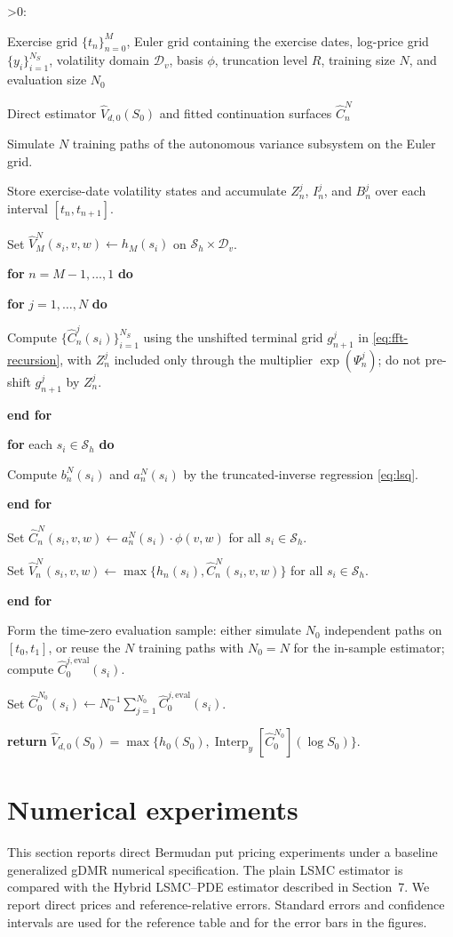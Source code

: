 \documentclass[pdflatex,sn-mathphys-num]{sn-jnl}
\makeatletter
\newcounter{ALG@line}
\newenvironment{algorithmic}[1][0]{%
  \setcounter{ALG@line}{0}%
  \def\ALG@freq{#1}%
  \begin{list}{\ifnum\ALG@freq>0\refstepcounter{ALG@line}\arabic{ALG@line}:\fi}{%
    \setlength{\leftmargin}{2.2em}%
    \setlength{\labelwidth}{1.8em}%
    \setlength{\labelsep}{0.4em}%
    \setlength{\itemsep}{2pt}%
    \setlength{\parsep}{0pt}%
    \setlength{\topsep}{3pt}%
  }%
}{\end{list}}
\newcommand{\Require}{\item[\textbf{Require:}]}
\newcommand{\Ensure}{\item[\textbf{Ensure:}]}
\newcommand{\State}{\item}
\newcommand{\For}[1]{\State \textbf{for} #1 \textbf{do}}
\newcommand{\EndFor}{\State \textbf{end for}}
\theoremstyle{thmstyleone}%
\theoremstyle{thmstylethree}%
\theoremstyle{thmstyletwo}%
\makeatother
\begin{document}
\begin{algorithm}[H]
\caption{Hybrid LSMC--PDE recursion}\label{alg:hybrid-lsmc-pde}
\begin{algorithmic}[1]
\Require Exercise grid $\{t_n\}_{n=0}^M$, Euler grid containing the exercise dates, log-price grid $\{y_i\}_{i=1}^{N_S}$, volatility domain $\mathcal D_v$, basis $\phi$, truncation level $R$, training size $N$, and evaluation size $N_0$
\Ensure Direct estimator $\widehat V_{d,0}(S_0)$ and fitted continuation surfaces $\widehat C_n^N$
\State Simulate $N$ training paths of the autonomous variance subsystem on the Euler grid.
\State Store exercise-date volatility states and accumulate $Z_n^j$, $I_n^j$, and $B_n^j$ over each interval $[t_n,t_{n+1}]$.
\State Set $\widehat V_M^N(s_i,v,w)\gets h_M(s_i)$ on $\mathcal S_h\times\mathcal D_v$.
\For{$n=M-1,\ldots,1$}
    \For{$j=1,\ldots,N$}
        \State Compute $\{\widehat C_n^j(s_i)\}_{i=1}^{N_S}$ using the unshifted terminal grid $g_{n+1}^j$ in \eqref{eq:fft-recursion}, with $Z_n^j$ included only through the multiplier $\exp(\Psi_n^j)$; do not pre-shift $g_{n+1}^j$ by $Z_n^j$.
    \EndFor
    \For{each $s_i\in\mathcal S_h$}
        \State Compute $b_n^N(s_i)$ and $a_n^N(s_i)$ by the truncated-inverse regression \eqref{eq:lsq}.
    \EndFor
    \State Set $\widehat C_n^N(s_i,v,w)\gets a_n^N(s_i)\cdot\phi(v,w)$ for all $s_i\in\mathcal S_h$.
    \State Set $\widehat V_n^N(s_i,v,w)\gets\max\{h_n(s_i),\widehat C_n^N(s_i,v,w)\}$ for all $s_i\in\mathcal S_h$.
\EndFor
\State Form the time-zero evaluation sample: either simulate $N_0$ independent paths on $[t_0,t_1]$, or reuse the $N$ training paths with $N_0=N$ for the in-sample estimator; compute $\widehat C_0^{j,\mathrm{eval}}(s_i)$.
\State Set $\widehat C_0^{N_0}(s_i)\gets N_0^{-1}\sum_{j=1}^{N_0}\widehat C_0^{j,\mathrm{eval}}(s_i)$.
\State \textbf{return} $\widehat V_{d,0}(S_0)=\max\{h_0(S_0),\operatorname{Interp}_y[\widehat C_0^{N_0}](\log S_0)\}$.
\end{algorithmic}
\end{algorithm}
\section{Numerical experiments}\label{sec:numerical}

This section reports direct Bermudan put pricing experiments under a baseline
generalized gDMR numerical specification. The plain LSMC estimator
\cite{longstaff2001valuing} is compared with the Hybrid LSMC--PDE estimator
described in Section~7. We report direct prices and reference-relative errors.
Standard errors and confidence intervals are used for the reference table and
for the error bars in the figures.
\end{document}
